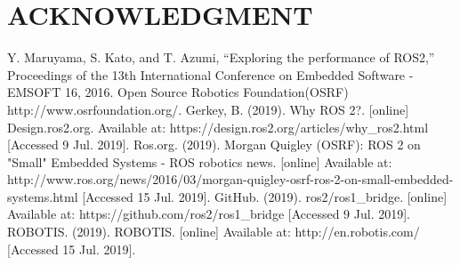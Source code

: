 \documentclass[letterpaper, 10 pt, conference]{ieeeconf}  %
\begin{document}
\section*{ACKNOWLEDGMENT}
\begin{thebibliography}{99}

 Y. Maruyama, S. Kato, and T. Azumi, “Exploring the performance of ROS2,” Proceedings of the 13th International Conference on Embedded Software - EMSOFT 16, 2016. 
 Open Source Robotics Foundation(OSRF) http://www.osrfoundation.org/.
 Gerkey, B. (2019). Why ROS 2?. [online] Design.ros2.org. Available at: https://design.ros2.org/articles/why\_ros2.html [Accessed 9 Jul. 2019].
Ros.org. (2019). Morgan Quigley (OSRF): ROS 2 on "Small" Embedded Systems - ROS robotics news. [online] Available at: http://www.ros.org/news/2016/03/morgan-quigley-osrf-ros-2-on-small-embedded-systems.html [Accessed 15 Jul. 2019].
 GitHub. (2019). ros2/ros1\_bridge. [online] Available at: https://github.com/ros2/ros1\_bridge [Accessed 9 Jul. 2019].
 ROBOTIS. (2019). ROBOTIS. [online] Available at: http://en.robotis.com/ [Accessed 15 Jul. 2019].
\end{thebibliography}
\end{document}
